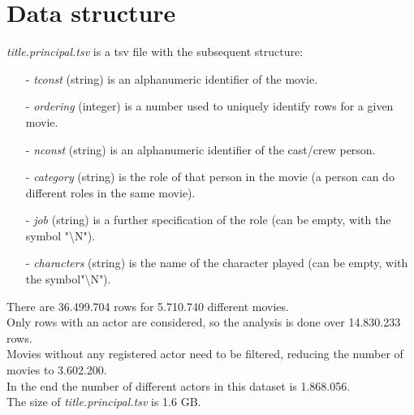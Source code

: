 \documentclass[14pt]{extarticle}
\begin{document}
\section{Data structure}
{\it title.principal.tsv} is a tsv file with the subsequent structure:
\begin{itemize}[leftmargin=*]
\vspace{-0.4cm}\item[-]{\it tconst} (string) is an alphanumeric identifier of the movie.
\vspace{-0.4cm}\item[-]{\it ordering} (integer) is a number used to uniquely identify rows for a given movie.
\vspace{-0.4cm}\item[-]{\it nconst} (string) is an alphanumeric identifier of the cast/crew person.
\vspace{-0.4cm}\item[-]{\it category} (string) is the role of that person in the movie (a person can do different roles in the same movie).
\vspace{-0.4cm}\item[-]{\it job} (string) is a further specification of the role (can be empty, with the symbol "\textbackslash N").
\vspace{-0.4cm}\item[-]{\it characters} (string) is the name of the character played (can be empty, with the symbol"\textbackslash N").
\end{itemize}
There are 36.499.704 rows for 5.710.740 different movies.\\
Only rows with an actor are considered, so the analysis is done over 14.830.233 rows.\\
Movies without any registered actor need to be filtered, reducing the number of movies to 3.602.200.\\
In the end the number of different actors in this dataset is 1.868.056.\\
The size of {\it title.principal.tsv} is 1.6 GB.\\
\end{document}
